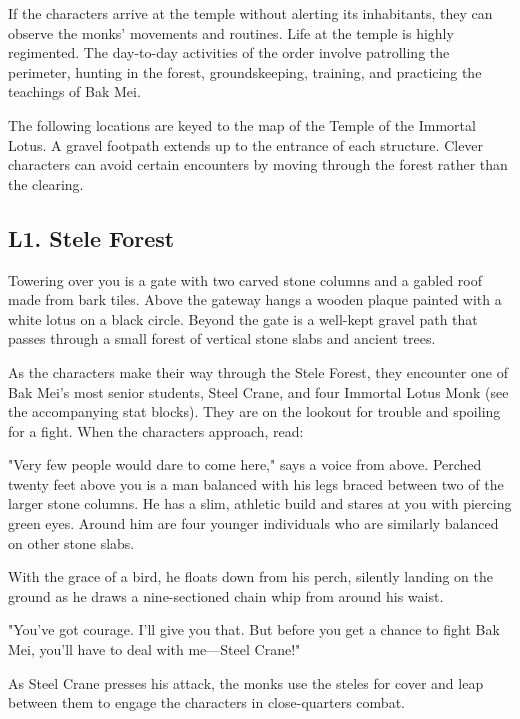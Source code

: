 \documentclass[10pt,a4paper,twoside,bg=print,twocolumn,openany,nodeprecatedcode]{dndbook}
\begin{document}
If the characters arrive at the temple without alerting its inhabitants, they can observe the monks' movements and routines. Life at the temple is highly regimented. The day-to-day activities of the order involve patrolling the perimeter, hunting in the forest, groundskeeping, training, and practicing the teachings of Bak Mei.

The following locations are keyed to the map of the Temple of the Immortal Lotus. A gravel footpath extends up to the entrance of each structure. Clever characters can avoid certain encounters by moving through the forest rather than the clearing.

\subsection{L1. Stele Forest}
\begin{DndReadAloud}{}
Towering over you is a gate with two carved stone columns and a gabled roof made from bark tiles. Above the gateway hangs a wooden plaque painted with a white lotus on a black circle. Beyond the gate is a well-kept gravel path that passes through a small forest of vertical stone slabs and ancient trees.

\end{DndReadAloud}

As the characters make their way through the Stele Forest, they encounter one of Bak Mei's most senior students, Steel Crane, and four Immortal Lotus Monk (see the accompanying stat blocks). They are on the lookout for trouble and spoiling for a fight. When the characters approach, read:

\begin{DndReadAloud}{}
"Very few people would dare to come here," says a voice from above. Perched twenty feet above you is a man balanced with his legs braced between two of the larger stone columns. He has a slim, athletic build and stares at you with piercing green eyes. Around him are four younger individuals who are similarly balanced on other stone slabs.

With the grace of a bird, he floats down from his perch, silently landing on the ground as he draws a nine-sectioned chain whip from around his waist.

"You've got courage. I'll give you that. But before you get a chance to fight Bak Mei, you'll have to deal with me—Steel Crane!"

\end{DndReadAloud}

As Steel Crane presses his attack, the monks use the steles for cover and leap between them to engage the characters in close-quarters combat.
\end{document}
